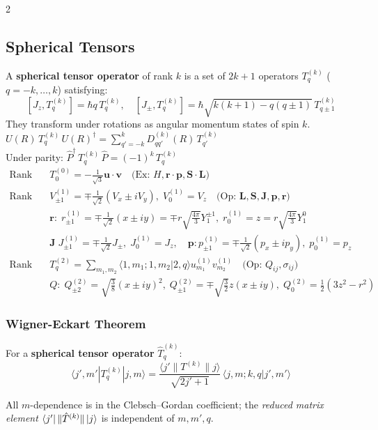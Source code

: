\documentclass[9pt,a4paper]{article} %
\begin{document}
\begin{multicols}{2}
\subsection{Spherical Tensors}
A \textbf{spherical tensor operator} of rank $k$ is a set of $2k+1$ operators $T^{(k)}_q$ ($q=-k,\dots,k$) satisfying:
\[
[J_z, T^{(k)}_q] = \hbar q \, T^{(k)}_q, \quad
[J_\pm, T^{(k)}_q] = \hbar \sqrt{k(k+1)-q(q\pm1)} \, T^{(k)}_{q\pm1}
\]
They transform under rotations as angular momentum states of spin $k$.
$U(R) \, T^{(k)}_q \, U(R)^\dagger = \sum_{q' = -k}^{k} D^{(k)}_{q q'}(R) \, T^{(k)}_{q'}$
\\ Under parity: $\hat{P}^\dagger \, T^{(k)}_q \, \hat{P} = (-1)^k \, T^{(k)}_q$
{\footnotesize
\[
\begin{aligned}
\text{Rank 0:} \quad & T^{(0)}_0 = -\frac{1}{\sqrt{3}} \mathbf{u} \cdot \mathbf{v} \quad \text{(Ex: } H, \mathbf{r} \cdot \mathbf{p}, \mathbf{S} \cdot \mathbf{L}\text{)} \\
\hline
\text{Rank 1:} \quad & V^{(1)}_{\pm 1} = \mp\frac{1}{\sqrt{2}}(V_x \pm iV_y), \; V^{(1)}_{0} = V_z \quad \text{(Op: } \mathbf{L}, \mathbf{S}, \mathbf{J}, \mathbf{p}, \mathbf{r}\text{)} \\
& \mathbf{r}: \; r^{(1)}_{\pm 1} = \mp\frac{1}{\sqrt{2}}(x \pm iy) = \mp r\sqrt{\frac{4\pi}{3}} Y_1^{\pm 1}, \; r^{(1)}_{0} = z = r\sqrt{\frac{4\pi}{3}} Y_1^0 \\
& \mathbf{J} \; J^{(1)}_{\pm 1} = \mp\frac{1}{\sqrt{2}}J_{\pm}, \; J^{(1)}_{0} = J_z, \quad \mathbf{p}:p^{(1)}_{\pm 1} = \mp\frac{1}{\sqrt{2}}(p_x \pm ip_y), \; p^{(1)}_{0} = p_z \\
\hline
\text{Rank 2:} \quad & T^{(2)}_q = \sum_{m_1, m_2} \langle 1, m_1; 1, m_2 | 2, q \rangle u^{(1)}_{m_1} v^{(1)}_{m_2} \quad \text{(Op: } Q_{ij}, \sigma_{ij}\text{)} \\
& Q: \; Q^{(2)}_{\pm 2} = \sqrt{\frac{3}{8}}(x \pm iy)^2, \; Q^{(2)}_{\pm 1} = \mp\sqrt{\frac{3}{2}}z(x \pm iy), \; Q^{(2)}_{0} = \frac{1}{2}(3z^2 - r^2)
\end{aligned}
\]}


\subsubsection{Wigner-Eckart Theorem}
For a \textbf{spherical tensor operator} $\hat{T}^{(k)}_q$:
\[
\boxed{\langle j', m' | T^{(k)}_q | j, m \rangle = \frac{ \langle j' \| T^{(k)} \| j \rangle }{ \sqrt{2j' + 1} } \, \langle j, m ; k, q | j', m' \rangle}
\]

All $m$-dependence is in the Clebsch--Gordan coefficient; the \emph{reduced matrix element} $\bra{j'}\|\hat{T}^{(k)}\|\ket{j}$ is independent of $m,m',q$.


\end{multicols}
\end{document}
